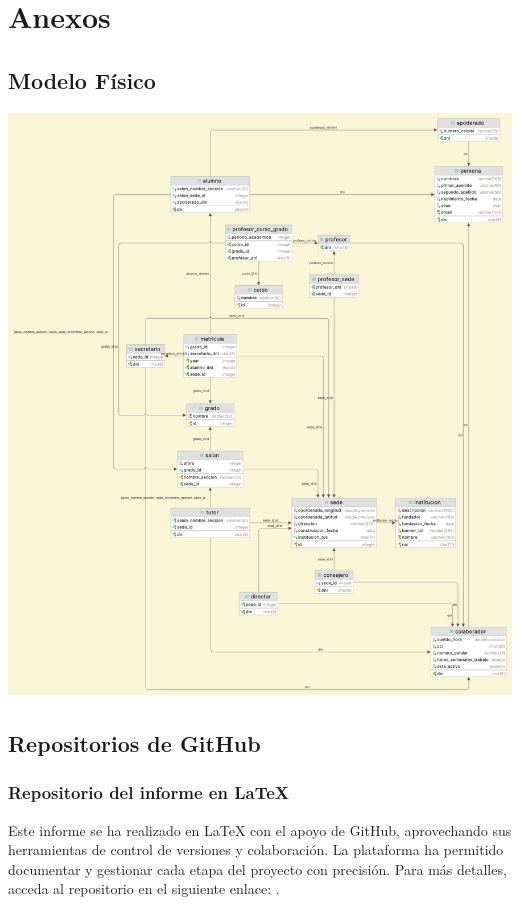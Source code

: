 \section{Anexos}
\subsection{Modelo Físico}
\begin{center}
	\includegraphics[width=\linewidth, height=0.75\textheight, keepaspectratio]{figures/modelo_fisico.png}
\end{center}
\subsection{Repositorios de GitHub}
\subsubsection{Repositorio del informe en LaTeX}{
	Este informe se ha realizado en LaTeX con el apoyo de GitHub, aprovechando sus herramientas de control de versiones y colaboración. La plataforma ha permitido documentar y gestionar cada etapa del proyecto con precisión. Para más detalles, acceda al repositorio en el siguiente enlace: .
}
